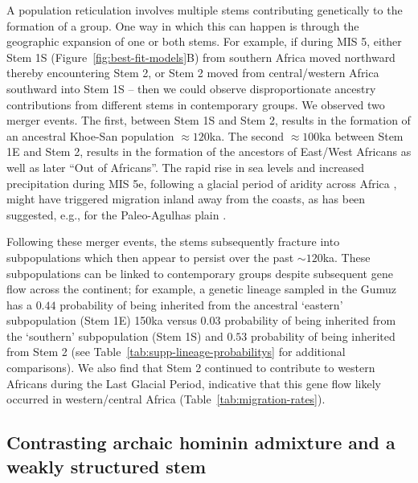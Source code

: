 \documentclass[]{article}
\begin{document}
A population reticulation involves multiple stems contributing genetically to
the formation of a group. One way in which this can happen is through the
geographic expansion of one or both stems. For example, if during MIS 5, either
Stem 1S (Figure~\ref{fig:best-fit-models}B) 
from southern Africa moved northward thereby encountering Stem 2,
or Stem 2 moved from central/western Africa southward into Stem 1S -- then we
could observe disproportionate ancestry contributions from different stems in
contemporary groups. We observed two merger events. The first, between Stem 1S and
Stem 2, results in the formation of an ancestral Khoe-San population $\approx120$ka.
The second $\approx100$ka between Stem 1E and Stem 2, results in the formation of the
ancestors of East/West Africans as well as later ``Out of Africans''. The rapid
rise in sea levels and increased precipitation during MIS 5e, following a
glacial period of aridity across Africa \citep{Blome2012-lw}, might have
triggered migration inland away from the coasts, as has been suggested, e.g., for the
Paleo-Agulhas plain \citep{Marean2014-pg}.


Following these merger events, the stems subsequently fracture into
subpopulations which then appear to persist over the past $\sim120$ka. These
subpopulations can be linked to contemporary groups despite subsequent gene flow
across the continent; for example, a genetic lineage sampled in the Gumuz has a
$0.44$ probability of being inherited from the ancestral ‘eastern’ subpopulation
(Stem 1E) 150ka versus $0.03$ probability of being inherited from the ‘southern’
subpopulation (Stem 1S) and $0.53$ probability of being inherited from Stem 2
(see Table~\ref{tab:supp-lineage-probabilitys} for additional comparisons). We also
find that Stem 2 continued to contribute to western Africans during the Last
Glacial Period, indicative that this gene flow likely occurred in
western/central Africa (Table~\ref{tab:migration-rates}). 



\subsection*{Contrasting archaic hominin admixture and a weakly structured stem}
\end{document}
